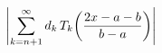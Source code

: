 \[\left|\sum_{k=n+1}^{\infty}{}d_{k}\mathop{T_{k}\/}\nolimits\!\left(\frac{2x-a-%
b}{b-a}\right)\right|\]